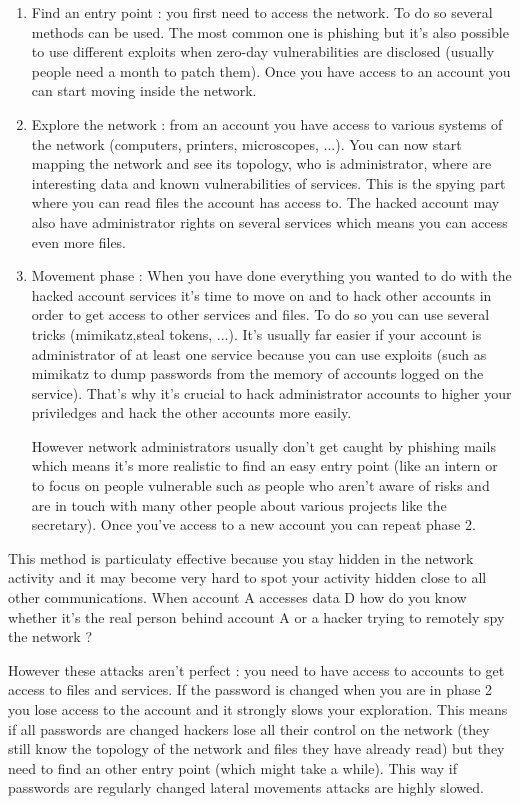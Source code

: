 \documentclass[11pt]{article}
\begin{document}
\begin{enumerate}
\item Find an entry point : you first need to access the network. To do so several methods can be used. The most common one is phishing but it's also possible to use different exploits when zero-day vulnerabilities are disclosed (usually people need a month to patch them). Once you have access to an account you can start moving inside the network.
\item Explore the network : from an account you have access to various systems of the network (computers, printers, microscopes, ...). You can now start mapping the network and see its topology, who is administrator, where are interesting data and known vulnerabilities of services. This is the spying part where you can read files the account has access to. The hacked account may also have administrator rights on several services which means you can access even more files.\\
\item Movement phase : When you have done everything you wanted to do with the hacked account services it's time to move on and to hack other accounts in order to get access to other services and files. To do so you can use several tricks (mimikatz,steal tokens, ...). It's usually far easier if your account is administrator of at least one service because you can use exploits (such as mimikatz to dump passwords from the memory of accounts logged on the service). That's why it's crucial to hack administrator accounts to higher your priviledges and hack the other accounts more easily. 

However network administrators usually don't get caught by phishing mails which means it's more realistic to find an easy entry point (like an intern or to focus on people vulnerable such as people who aren't aware of risks and are in touch with many other people about various projects like the secretary). Once you've access to a new account you can repeat phase 2.
\end{enumerate}
This method is particulaty effective because you stay hidden in the network activity and it may become very hard to spot your activity hidden close to all other communications. When account A accesses data D how do you know whether it's the real person behind account A or a hacker trying to remotely spy the network ? 

However these attacks aren't perfect : you need to have access to accounts to get access to files and services. If the password is changed when you are in phase 2 you lose access to the account and it strongly slows your exploration. This means if all passwords are changed hackers lose all their control on the network (they still know the topology of the network and files they have already read) but they need to find an other entry point (which might take a while). This way if passwords are regularly changed lateral movements attacks are highly slowed. 
\end{document}
